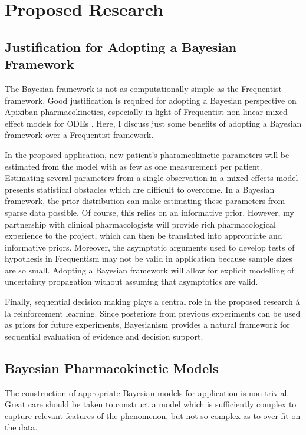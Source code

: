 \section{Proposed Research}

\subsection{Justification for Adopting a Bayesian Framework}

The Bayesian framework is not as computationally simple as the Frequentist framework.  Good justification is required for adopting a Bayesian perspective on Apixiban pharmacokinetics, especially in light of Frequentist non-linear mixed effect models for ODEs \cite{tornoe2004non}.  Here, I discuss just some benefits of adopting a Bayesian framework over a Frequentist framework.

In the proposed application, new patient's pharamcokinetic parameters will be estimated from the model with as few as one measurement per patient.  Estimating several parameters from a single observation in a mixed effects model presents statistical obstacles which are difficult to overcome.  In a Bayesian framework, the prior distribution can make estimating these parameters from sparse data possible.  Of course, this relies on an informative prior.  However, my partnership with clinical pharmacologists will provide rich pharmacological experience to the project, which can then be translated into appropriate and informative priors.  Moreover, the asymptotic arguments used to develop tests of hypothesis in Frequentism may not be valid in application because sample sizes are so small.  Adopting a Bayesian framework will allow for explicit modelling of uncertainty propagation without assuming that asymptotics are valid.

Finally, sequential decision making plays a central role in the proposed research \'{a} la reinforcement learning.  Since posteriors from previous experiments can be used as priors for future experiments, Bayesianism provides a natural framework for sequential evaluation of evidence and decision support.


\subsection{Bayesian Pharmacokinetic Models}

The construction of appropriate Bayesian models for application is non-trivial.  Great care should be taken to construct a model which is sufficiently complex to capture relevant features of the phenomenon, but not so complex as to over fit on the data. 

